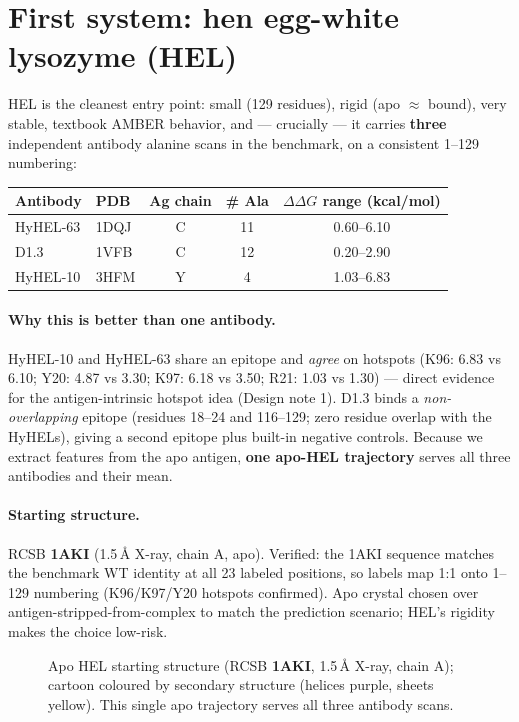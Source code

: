 \section{First system: hen egg-white lysozyme (HEL)}

HEL is the cleanest entry point: small (129 residues), rigid (apo $\approx$ bound), very stable,
textbook AMBER behavior, and --- crucially --- it carries \textbf{three} independent antibody
alanine scans in the benchmark, on a consistent 1--129 numbering:

\begin{center}
\begin{tabular}{llccc}
\toprule
Antibody & PDB & Ag chain & \# Ala & $\Delta\Delta G$ range (kcal/mol) \\
\midrule
HyHEL-63 & 1DQJ & C & 11 & 0.60--6.10 \\
D1.3     & 1VFB & C & 12 & 0.20--2.90 \\
HyHEL-10 & 3HFM & Y &  4 & 1.03--6.83 \\
\bottomrule
\end{tabular}
\end{center}

\paragraph{Why this is better than one antibody.} HyHEL-10 and HyHEL-63 share an epitope and
\emph{agree} on hotspots (K96: 6.83 vs 6.10; Y20: 4.87 vs 3.30; K97: 6.18 vs 3.50; R21: 1.03 vs 1.30)
--- direct evidence for the antigen-intrinsic hotspot idea (Design note 1). D1.3 binds a
\emph{non-overlapping} epitope (residues 18--24 and 116--129; zero residue overlap with the HyHELs),
giving a second epitope plus built-in negative controls. Because we extract features from the apo
antigen, \textbf{one apo-HEL trajectory} serves all three antibodies and their mean.

\paragraph{Starting structure.} RCSB \textbf{1AKI} (1.5\,\AA{} X-ray, chain A, apo). Verified: the
1AKI sequence matches the benchmark WT identity at all 23 labeled positions, so labels map 1:1 onto
1--129 numbering (K96/K97/Y20 hotspots confirmed). Apo crystal chosen over antigen-stripped-from-complex
to match the prediction scenario; HEL's rigidity makes the choice low-risk.
\begin{figure}[H]\centering{}
\caption{Apo HEL starting structure (RCSB \textbf{1AKI}, 1.5\,\AA{} X-ray, chain A); cartoon
coloured by secondary structure (helices purple, sheets yellow). This single apo trajectory
serves all three antibody scans.}\end{figure}

